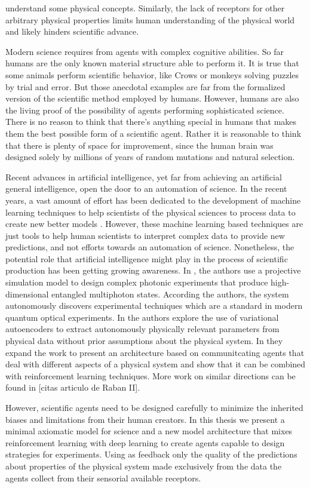 \documentclass[11pt,a4paper,twoside]{report}
\newcommand{\+}{\textnormal{+} }
\theoremstyle{definition}
\numberwithin{equation}{chapter}
\begin{document}
understand some physical concepts. Similarly, the lack of receptors for
other arbitrary physical properties limits human understanding of the physical 
world and likely hinders scientific advance.
\\ 
\par 
Modern science requires from agents with complex cognitive abilities. So far 
humans are the only known material structure able to perform it. It is true that
some animals perform scientific behavior, like Crows or monkeys solving puzzles 
by trial and error. But those anecdotal examples are far from the formalized 
version of the scientific method employed by humans. However, humans are also 
the living proof of the possibility of agents performing sophisticated science.
There is no reason to think that there's anything special in humans that makes 
them the best possible form of a scientific agent. Rather it is reasonable to 
think that there is plenty of space for improvement, since the human brain was
designed solely by millions of years of random mutations and natural selection.

Recent advances in artificial intelligence, yet far from achieving an 
artificial general intelligence, open the door to an automation of science. In 
the recent years, a vast amount of effort has been dedicated to the development
of machine learning techniques to help scientists of the physical sciences to
process data to create new better models \cite{Carleo_2019}. However, these 
machine learning based techniques are just tools to help human scientists to 
interpret complex data to provide new predictions, and not efforts towards an 
automation of science. Nonetheless, the potential role that artificial intelligence
might play in the process of scientific production has been getting growing 
awareness. In \cite{Melnikov_2018}, the authors use a projective simulation 
model to design complex photonic experiments that produce high-dimensional 
entangled multiphoton states. According the authors, the system autonomously 
discovers experimental techniques which are a standard in modern quantum optical
experiments. In \cite{iten2020discovering} the authors explore the use of 
variational autoencoders to extract autonomously physically relevant parameters
from physical data without prior assumptions about the physical system. In
\cite{nautrup2020operationally} they expand the work to present an architecture
based on communitcating agents that deal with different aspects of a physical 
system and show that it can be combined with reinforcement learning techniques.
More work on similar directions can be found in [citas articulo de Raban II].
\par
However, scientific agents need to be designed carefully to minimize the 
inherited biases and limitations from their human creators. In this thesis we 
present a minimal axiomatic model for science and a new model architecture that
mixes reinforcement learning with deep learning to create agents capable to
design strategies for experiments. Using as feedback only the quality of the 
predictions about properties of the physical system made exclusively from the 
data the agents collect from their sensorial available receptors. 
\end{document}
